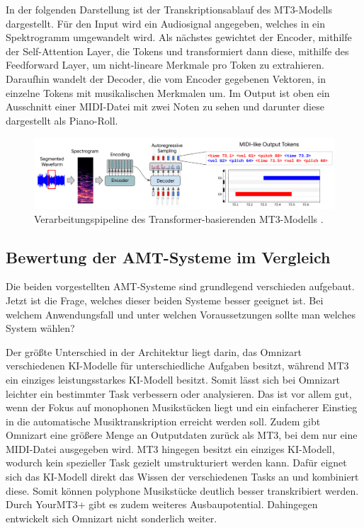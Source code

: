 In der folgenden Darstellung ist der Transkriptionsablauf des MT3-Modells dargestellt.
Für den Input wird ein Audiosignal angegeben, welches in ein Spektrogramm umgewandelt wird.
Als nächstes gewichtet der Encoder, mithilfe der Self-Attention Layer, die Tokens und transformiert dann diese,
mithilfe des Feedforward Layer, um nicht-lineare Merkmale pro Token zu extrahieren.
Daraufhin wandelt der Decoder, die vom Encoder gegebenen Vektoren, in einzelne Tokens mit musikalischen Merkmalen um.
Im Output ist oben ein Ausschnitt einer MIDI-Datei mit zwei Noten zu sehen und darunter diese dargestellt als Piano-Roll.
\begin{figure}[H]
    \centering
    \includegraphics[width=1\textwidth]{Graphics/transcription_transformer}
    \caption[Verarbeitungspipeline des MT3-Modells]{Verarbeitungspipeline des Transformer-basierenden MT3-Modells  \cite{mt3colab}.}
    \label{fig:mt3_process}
\end{figure}

\subsection{Bewertung der AMT-Systeme im Vergleich}
Die beiden vorgestellten AMT-Systeme sind grundlegend verschieden aufgebaut.
Jetzt ist die Frage, welches dieser beiden Systeme besser geeignet ist.
Bei welchem Anwendungsfall und unter welchen Voraussetzungen sollte man welches System wählen?

Der größte Unterschied in der Architektur liegt darin,
das Omnizart verschiedenen KI-Modelle für unterschiedliche Aufgaben besitzt,
während MT3 ein einziges leistungsstarkes KI-Modell besitzt.
Somit lässt sich bei Omnizart leichter ein bestimmter Task verbessern oder analysieren.
Das ist vor allem gut, wenn der Fokus auf monophonen Musikstücken liegt
und ein einfacherer Einstieg in die automatische Musiktranskription erreicht werden soll.
Zudem gibt Omnizart eine größere Menge an Outputdaten zurück als MT3, bei dem nur eine MIDI-Datei ausgegeben wird.
MT3 hingegen besitzt ein einziges KI-Modell, wodurch kein spezieller Task gezielt umstrukturiert werden kann.
Dafür eignet sich das KI-Modell direkt das Wissen der verschiedenen Tasks an und kombiniert diese.
Somit können polyphone Musikstücke deutlich besser transkribiert werden.
Durch YourMT3+ gibt es zudem weiteres Ausbaupotential.
Dahingegen entwickelt sich Omnizart nicht sonderlich weiter.

